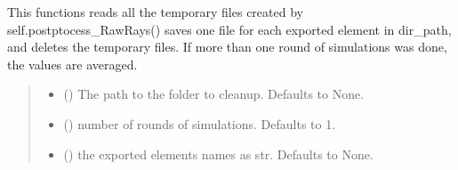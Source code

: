 \documentclass[letterpaper,10pt,english]{sphinxmanual}
\begin{document}
\begin{fulllineitems}
\begin{fulllineitems}
\label{\detokenize{index:raypyng.postprocessing.PostProcess.cleanup}}
\pysigstartsignatures
{}
\pysigstopsignatures
\sphinxAtStartPar
This functions reads all the temporary files created by self.postptocess\_RawRays()
saves one file for each exported element in dir\_path, and deletes the temporary files.
If more than one round of simulations was done, the values are averaged.
\begin{quote}\begin{description}
\begin{itemize}
\item {} 
\sphinxAtStartPar
{} (\sphinxstyleliteralemphasis{\sphinxupquote{, }}) \textendash{} The path to the folder to cleanup. Defaults to None.

\item {} 
\sphinxAtStartPar
{} (\sphinxstyleliteralemphasis{\sphinxupquote{, }}) \textendash{} number of rounds of simulations. Defaults to 1.

\item {} 
\sphinxAtStartPar
{} (\sphinxstyleliteralemphasis{\sphinxupquote{, }}) \textendash{} the exported elements names as str. Defaults to None.

\end{itemize}

\end{description}\end{quote}

\end{fulllineitems}


\end{fulllineitems}
\end{document}
